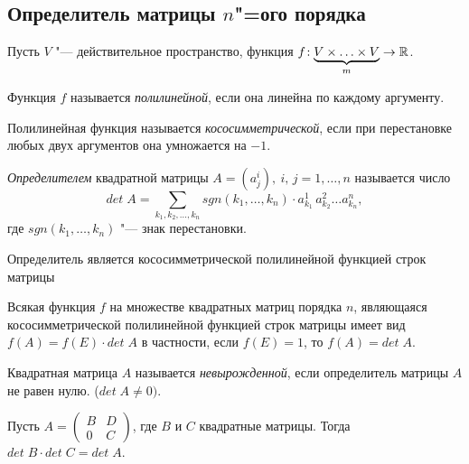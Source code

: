 \subsection*{Определитель матрицы $n$"=ого порядка}

Пусть $V$ "--- действительное пространство, функция $f\!: \underbrace{V \times \ldots \times V}_{m} \to \mathbb{R}$.
\begin{definition}
  Функция $f$ называется \textit{полилинейной}, если она линейна по каждому аргументу.
\end{definition}
\begin{definition}
  Полилинейная функция называется \textit{кососимметрической}, если при перестановке любых двух аргументов она умножается на $-1$.
\end{definition}

\begin{definition}
  \textit{Определителем} квадратной матрицы $A = (a_j^i),~ i,\,j = 1,\ldots,n$ называется число $$det\;A = \sum\limits_{k_1, k_2, \ldots, k_n}sgn(k_1, \ldots, k_n) \cdot a_{k_1}^1 \, a_{k_2}^2 \ldots a_{k_n}^n, $$
  где $sgn(k_1, \ldots, k_n)$ "--- знак перестановки.
\end{definition}

\begin{theorem}
  Определитель является кососимметрической полилинейной функцией строк матрицы 
  
  Всякая функция $f$ на множестве квадратных матриц порядка $n$, являющаяся кососимметрической полилинейной функцией строк матрицы имеет вид
  $f(A) = f(E) \cdot det\;A$ в частности, если $f(E) = 1$, то $f(A) = det\;A$.
\end{theorem}

\begin{definition}
  Квадратная матрица $A$ называется \textit{невырожденной}, если определитель матрицы $A$ не равен нулю. ($det\; A \neq 0)$.
\end{definition}
\begin{theorem}
  Пусть $A = \begin{pmatrix}
    B & D \\
    0 & C
  \end{pmatrix}$, где $B$ и $C$ квадратные матрицы. Тогда $det\;B \cdot det\;C = det\;A$.
\end{theorem}

